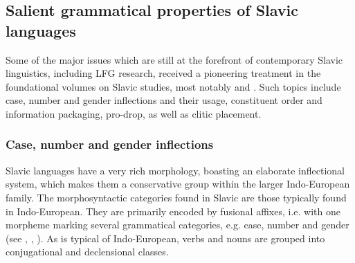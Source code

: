 \documentclass[output=paper,hidelinks]{langscibook}
\begin{document}
\subsection{Salient grammatical properties
  \textbf{of} \textbf{Slavic} \textbf{languages}}
\label{sec:Slavic:1.2}


Some of the major issues which are still at the forefront of contemporary Slavic linguistics, including LFG research, received a pioneering treatment in the foundational volumes on Slavic studies, most notably \citet{Miklosich} and \citet{Vondrak1906}. Such topics include case, number and gender inflections and their usage, constituent order and information packaging, pro-drop, as well as clitic placement. 

\subsubsection{Case, number and gender inflections}
\label{sec:Slavic:1.2.1}

Slavic languages have a very rich morphology, boasting an elaborate inflectional system, which makes them a conservative group within the larger Indo-Europe\-an family. The morphosyntactic categories found in Slavic are those typically found in Indo-European. They are primarily encoded by fusional affixes, i.e. with one morpheme marking several grammatical categories, e.g. case, number and gender (see \citealt[6, 14--17]{ComrieCorbett1993}, \citealt[Chapters 5 and 6]{SussexCubberley2006}, \citealt{BergerGutschmidtKempgenKosta2009}). As is typical of Indo-European, verbs and nouns are grouped into conjugational and declensional classes.
\end{document}
